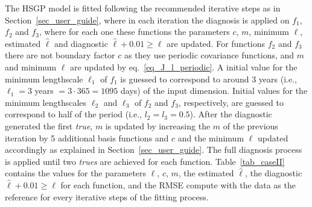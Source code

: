 The HSGP model is fitted following the recommended iterative steps as in Section~\ref{sec_user_guide}, where in each iteration the diagnosis is applied on $f_1$, $f_2$ and $f_3$, where for each one these functions the parameters $c$, $m$, minimum $\ell$, estimated $\hat{\ell}$ and diagnostic $\hat{\ell} + 0.01 \geq \ell$ are updated. For functions $f_2$ and $f_3$ there are not boundary factor $c$ as they use periodic covariance functions, and $m$ and minimum $\ell$ are updated by eq.~\eqref{eq_J_l_periodic}. A initial value for the minimum lengthscale $\ell_1$ of $f_1$ is guessed to correspond to around 3 years (i.e., $\ell_1=3$ years $= 3\cdot 365=1095$ days) of the input dimension. Initial values for the minimum lengthscales $\ell_2$ and $\ell_3$ of $f_2$ and $f_3$, respectively, are guessed to correspond to half of the period (i.e., $l_2=l_3=0.5$). After the diagnostic generated the first \textit{true}, $m$ is updated by increasing the $m$ of the previous iteration by 5 additional basis functions and $c$ and the minimum $\ell$ updated accordingly as explained in Section~\ref{sec_user_guide}. The full diagnosis process is applied until two \textit{trues} are achieved for each function. Table~\ref{tab_caseII} contains the values for the parameters $\ell$, $c$, $m$, the estimated $\hat{\ell}$, the diagnostic $\hat{\ell} + 0.01 \geq \ell$ for each function, and the RMSE compute with the data as the reference for every iterative steps of the fitting process.

